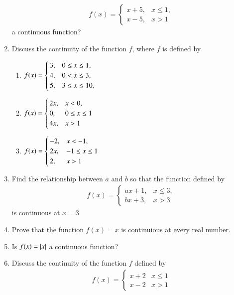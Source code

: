 \begin{enumerate}[label=\arabic*.,ref=\thesubsection.\theenumi]
\begin{align}
f(x)=
\begin{cases}
x+5, & x \le 1,
\\
x-5, & x > 1
\end{cases}
\end{align}
%
a continuous function?
\item Discuss the continuity of the function $f$, where $f$ is defined by 
\begin{enumerate}
\item 
$
\begin{alignedat}[t]{2}
f(x)=
\begin{cases}
3, & 0 \le x \le 1,
\\
4, & 0 < x \le 3,
\\
5, & 3 \le x \le 10,
\end{cases}
\end{alignedat}
$
%
\item 
$
\begin{alignedat}[t]{2}
f(x)=
\begin{cases}
2x, & x < 0,
\\
0, & 0 \le x \le 1
\\
4x, &  x > 1
\end{cases}
\end{alignedat}
$
\item 
$
\begin{alignedat}[t]{2}
f(x)=
\begin{cases}
-2, & x < -1,
\\
2x, & -1 \le x \le  1
\\
2, & x >  1
\end{cases}
\end{alignedat}
$
\end{enumerate}
%
\item Find the relationship between $a$ and $b$ so that the function defined by 	
%
\begin{align}
f(x)=
\begin{cases}
ax+1, & x \le 3,
\\
bx+3, & x > 3
\end{cases}
\end{align}
%
is continuous at $x = 3$
%
\item Prove that the function $f(x) = x$ is continuious at every real number.
\item Is $f(x) = \left\vert x\right\vert$ a continuous function?
\item Discuss the continuity of the function $f$ defined by 
%
\begin{align}
f(x)  = 
\begin{cases}
x+2 & x \le 1
\\
x-2 & x > 1
\end{cases}
\end{align}


\end{enumerate}
